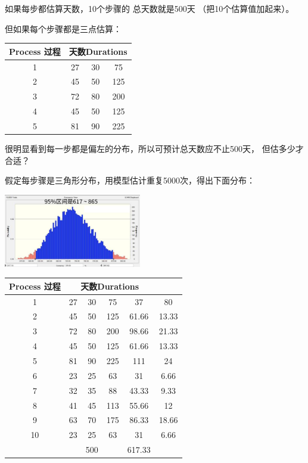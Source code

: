 如果每步都估算天数，10个步骤的 总天数就是500天 （把10个估算值加起来）。

但如果每个步骤都是三点估算：



\begin{tabular}{|c|c|c|c|}
\hline
Process 过程&\multicolumn{3}{c|}{天数Durations}\\
\hline
1&27&30&75\\
\hline
2&45&50&125\\
\hline
3&72&80&200\\
\hline
4&45&50&125\\
\hline
5&81&90&225\\
\hline
\end{tabular}

很明显看到每一步都是偏左的分布，所以可预计总天数应不止500天，
但估多少才合适？

假定每步骤是三角形分布，用模型估计重复5000次，得出下面分布：


\includegraphics[width=6cm]{微信图片_20240117093538.jpg}



\begin{tabular}{|c|c|c|c|c|c|}
\hline
Process 过程&\multicolumn{4}{c|}{天数Durations}\\
\hline
1&27&30&75&37&80\\
\hline
2&45&50&125&61.66&13.33\\
\hline
3&72&80&200&98.66&21.33\\
\hline
4&45&50&125&61.66&13.33\\
\hline
5&81&90&225&111&24\\
\hline
6&23&25&63&31&6.66\\
\hline
7&32&35&88&43.33&9.33\\
\hline
8&41&45&113&55.66&12\\
\hline
9&63&70&175&86.33&18.66\\
\hline
10&23&25&63&31&6.66\\
\hline
\:&\:&500&\:&617.33&\: \\
\hline
\end{tabular}

